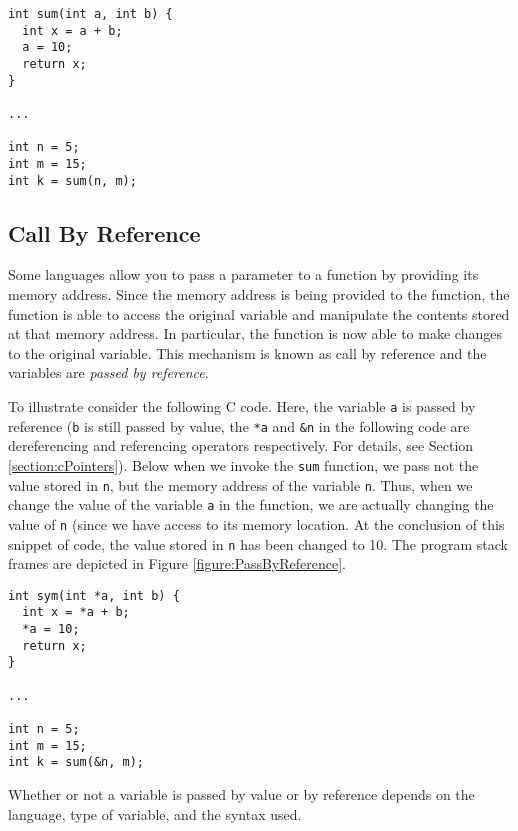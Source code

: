 \begin{verbatim}
int sum(int a, int b) {
  int x = a + b;
  a = 10;
  return x;
}

...

int n = 5;
int m = 15;
int k = sum(n, m);
\end{verbatim}



\subsection{Call By Reference}

Some languages allow you to pass a parameter to a function by
providing its memory address.  Since the memory address is being
provided to the function, the function is able to access the original
variable and manipulate the contents stored at that memory address.
In particular, the function is now able to make changes to the original
variable.  This mechanism is known as \gls{call by reference} and 
the variables are \emph{passed by reference}.

To illustrate consider the following C code. Here, the variable \texttt{a}
is passed by reference (\texttt{b} is still passed by value, 
the \texttt{*a} and \texttt{&n} in the following code
are dereferencing and referencing operators respectively.  For
details, see Section \ref{section:cPointers}).  Below when we
invoke the \texttt{sum} function, we pass not the value
stored in \texttt{n}, but the memory address of the
variable \texttt{n}.  Thus, when we change the value of
the variable \texttt{a} in the function, we are actually 
changing the value of \texttt{n} (since we have access
to its memory location.  At the conclusion of this snippet of
code, the value stored in \texttt{n} has been changed to
10.  The program stack frames are depicted in Figure \ref{figure:PassByReference}.

\begin{verbatim}
int sym(int *a, int b) {
  int x = *a + b;
  *a = 10;
  return x;
}

...

int n = 5;
int m = 15;
int k = sum(&n, m);
\end{verbatim}



Whether or not a variable is passed by value or by reference depends
on the language, type of variable, and the syntax used.  

